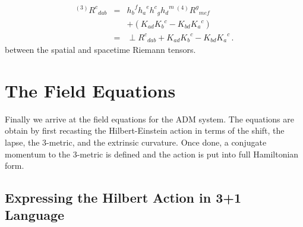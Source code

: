 \documentclass[twocolumn]{article}
\begin{document}
\begin{eqnarray}\label{eq:gauss}
 {}^{(3)} {R^c}_{dab} & = & {h_b}^f {h_a}^e {h^c}_g {h_d}^m
                            \, {}^{(4)} {R^g}_{mef} \nonumber \\
                      &   &
                            +
                            \left(   K_{ad} {K_b}^c
                                   - K_{bd} {K_a}^c
                            \right) \nonumber \\
                       & = & \perp {R^c}_{dab} + K_{ad}{K_b}^c - K_{bd}{K_a}^{c} \, .
\end{eqnarray}
between the spatial and spacetime Riemann tensors.

\section{The Field Equations}\label{S:Field_eqs}

Finally we arrive at the field equations for the ADM system.  The equations are
obtain by first recasting the Hilbert-Einstein action in terms of the shift, the
lapse, the 3-metric, and the extrinsic curvature.  Once done, a conjugate
momentum to the 3-metric is defined and the action is put into full Hamiltonian
form.

\subsection{Expressing the Hilbert Action in 3+1 Language}\label{SS:Hilbert_A}
\end{document}
